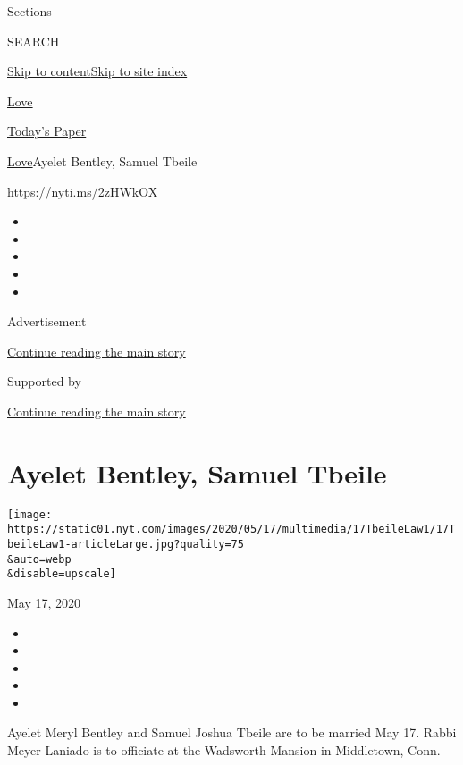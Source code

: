 Sections

SEARCH

\protect\hyperlink{site-content}{Skip to
content}\protect\hyperlink{site-index}{Skip to site index}

\href{https://www.nytimes.com/section/fashion/weddings}{Love}

\href{https://myaccount.nytimes.com/auth/login?response_type=cookie\&client_id=vi}{}

\href{https://www.nytimes.com/section/todayspaper}{Today's Paper}

\href{/section/fashion/weddings}{Love}\textbar{}Ayelet Bentley, Samuel
Tbeile

\url{https://nyti.ms/2zHWkOX}

\begin{itemize}
\item
\item
\item
\item
\item
\end{itemize}

Advertisement

\protect\hyperlink{after-top}{Continue reading the main story}

Supported by

\protect\hyperlink{after-sponsor}{Continue reading the main story}

\hypertarget{ayelet-bentley-samuel-tbeile}{%
\section{Ayelet Bentley, Samuel
Tbeile}\label{ayelet-bentley-samuel-tbeile}}

\texttt{[image: https://static01.nyt.com/images/2020/05/17/multimedia/17TbeileLaw1/17TbeileLaw1-articleLarge.jpg?quality=75\\\&auto=webp\\\&disable=upscale]}

May 17, 2020

\begin{itemize}
\item
\item
\item
\item
\item
\end{itemize}

Ayelet Meryl Bentley and Samuel Joshua Tbeile are to be married May 17.
Rabbi Meyer Laniado is to officiate at the Wadsworth Mansion in
Middletown, Conn.


